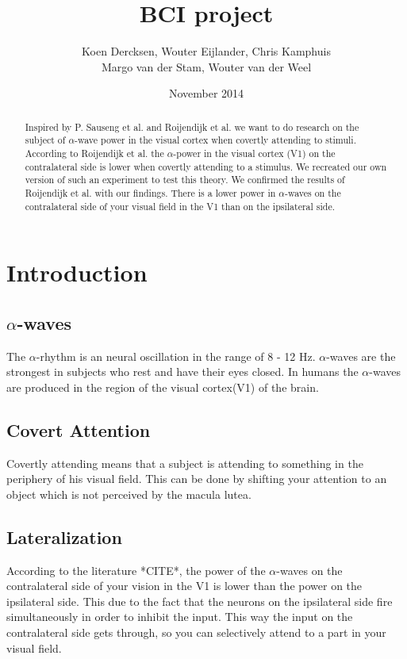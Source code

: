 \documentclass{article}
\title{BCI project}
\author{Koen Dercksen, Wouter Eijlander, Chris Kamphuis
        \\Margo van der Stam, Wouter van der Weel}
\date{November 2014}
\begin{document}
\maketitle
\begin{abstract}
    Inspired by P. Sauseng et al.\cite{Sauseng2005} and Roijendijk et al.
    \cite{Jason} we want to do research on the subject of $\alpha$-wave power
    in the visual cortex when covertly attending to stimuli. According to
    Roijendijk et al.\cite{Jason} the $\alpha$-power in the visual cortex (V1)
    on the contralateral side is lower when covertly attending to a stimulus.
    We recreated our own version of such an experiment to test this theory. We
    confirmed the results of Roijendijk et al.  \cite{Jason} with our findings.
    There is a lower power in $\alpha$-waves on the contralateral side of your
    visual field in the V1 than on the ipsilateral side. 
\end{abstract}

\section{Introduction}
\subsection{$\alpha$-waves}
The $\alpha$-rhythm is an neural oscillation in the range of 8 - 12 Hz.
$\alpha$-waves are the strongest in subjects who rest and have their eyes
closed. In humans the $\alpha$-waves are produced in the region of the visual
cortex(V1) of the brain. 
\subsection{Covert Attention}
Covertly attending means that a subject is attending to something in the
periphery of his visual field. This can be done by shifting your attention to
an object which is not perceived by the macula lutea.
\subsection{Lateralization}
According to the literature *CITE*, the power of the $\alpha$-waves on the
contralateral side of your vision in the V1 is lower than the power on the
ipsilateral side. This due to the fact that the neurons on the ipsilateral side
fire simultaneously in order to inhibit the input. This way the input on the
contralateral side gets through, so you can selectively attend to a part in
your visual field. %
\end{document}
